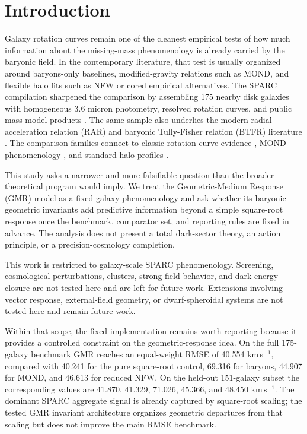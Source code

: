 ﻿\documentclass[twocolumn]{aastex701}
\begin{document}
\section{Introduction}

Galaxy rotation curves remain one of the cleanest empirical tests of how much information about the missing-mass phenomenology is already carried by the baryonic field. In the contemporary literature, that test is usually organized around baryons-only baselines, modified-gravity relations such as MOND, and flexible halo fits such as NFW or cored empirical alternatives. The SPARC compilation sharpened the comparison by assembling 175 nearby disk galaxies with homogeneous 3.6 micron photometry, resolved rotation curves, and public mass-model products \citep{lelli2016}. The same sample also underlies the modern radial-acceleration relation (RAR) and baryonic Tully-Fisher relation (BTFR) literature \citep{mcgaugh2016,lelli2019}. The comparison families connect to classic rotation-curve evidence \citep{rubin1980}, MOND phenomenology \citep{milgrom1983,famaey2012}, and standard halo profiles \citep{navarro1997,burkert1995}.

This study asks a narrower and more falsifiable question than the broader theoretical program would imply. We treat the Geometric-Medium Response (GMR) model as a fixed galaxy phenomenology and ask whether its baryonic geometric invariants add predictive information beyond a simple square-root response once the benchmark, comparator set, and reporting rules are fixed in advance. The analysis does not present a total dark-sector theory, an action principle, or a precision-cosmology completion.

This work is restricted to galaxy-scale SPARC phenomenology. Screening, cosmological perturbations, clusters, strong-field behavior, and dark-energy closure are not tested here and are left for future work. Extensions involving vector response, external-field geometry, or dwarf-spheroidal systems are not tested here and remain future work.

Within that scope, the fixed implementation remains worth reporting because it provides a controlled constraint on the geometric-response idea. On the full 175-galaxy benchmark GMR reaches an equal-weight RMSE of 40.554 km\,s$^{-1}$, compared with 40.241 for the pure square-root control, 69.316 for baryons, 44.907 for MOND, and 46.613 for reduced NFW. On the held-out 151-galaxy subset the corresponding values are 41.870, 41.329, 71.026, 45.366, and 48.450 km\,s$^{-1}$. The dominant SPARC aggregate signal is already captured by square-root scaling; the tested GMR invariant architecture organizes geometric departures from that scaling but does not improve the main RMSE benchmark.
\end{document}
